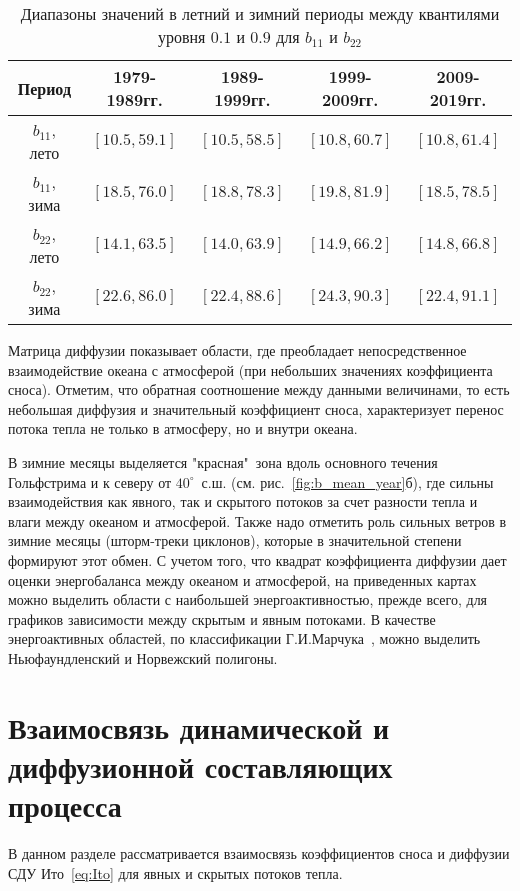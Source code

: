 \begin{table}[h!]
	\centering
	\caption{Диапазоны значений в летний и зимний периоды между квантилями уровня $0.1$ и $0.9$ для $b_{11}$ и $b_{22}$}
	\begin{tabular}{|c|c|c|c|c|}
		\hline
		Период & 1979-1989гг. &  1989-1999гг. & 1999-2009гг. & 2009-2019гг.\\
		\hline
		$b_{11}$, лето & $[10.5, 59.1]$ & $[10.5, 58.5]$ & $[10.8, 60.7]$ & $[10.8, 61.4]$\\ 
		\hline
		$b_{11}$, зима & $[18.5, 76.0]$ & $[18.8, 78.3]$ & $[19.8, 81.9]$ & $[18.5, 78.5]$\\ 
		\hline
		$b_{22}$, лето & $[14.1, 63.5]$ & $[14.0, 63.9]$ & $[14.9, 66.2]$ & $[14.8, 66.8]$\\ 
		\hline
		$b_{22}$, зима & $[22.6, 86.0]$ & $[22.4, 88.6]$ & $[24.3, 90.3]$ & $[22.4, 91.1]$\\ 
		\hline
	\end{tabular}
	\label{tab:quantiles_b}
\end{table}


Матрица диффузии показывает области, где преобладает непосредственное взаимодействие океана с атмосферой (при небольших значениях коэффициента сноса). Отметим, что обратная соотношение между данными величинами, то есть небольшая диффузия и значительный коэффициент сноса,  характеризует перенос потока тепла не только в атмосферу, но и внутри океана.

В зимние месяцы выделяется "красная"\ зона вдоль основного течения Гольфстрима и к северу от $40^\circ$~с.ш. (см. рис.~\ref{fig:b_mean_year}б), %
где сильны взаимодействия как явного, так и скрытого потоков за счет разности тепла и влаги между океаном и атмосферой. Также надо отметить роль сильных ветров в зимние месяцы (шторм-треки циклонов), которые в значительной степени формируют этот обмен. С учетом того, что квадрат коэффициента диффузии дает оценки энергобаланса между океаном и атмосферой, на приведенных картах можно выделить области с наибольшей энергоактивностью, прежде всего, для графиков зависимости между скрытым и явным потоками. В качестве энергоактивных областей, по классификации Г.И.Марчука~\cite{marchuk1989}, можно выделить Ньюфаундленский и Норвежский полигоны. 

\section{Взаимосвязь динамической и диффузионной составляющих процесса}
В данном разделе рассматривается взаимосвязь коэффициентов сноса и диффузии СДУ Ито~\eqref{eq:Ito} для явных и скрытых потоков тепла. 


